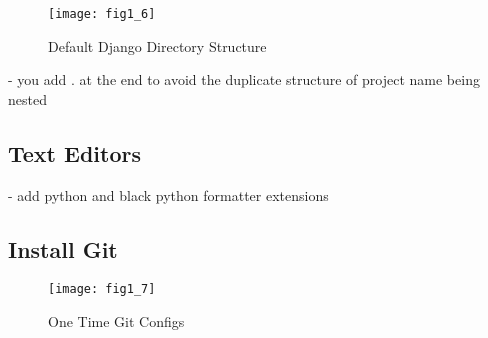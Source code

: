 \documentclass{article}
\begin{document}
\begin{figure}[H]
	\centering
	\texttt{[image: fig1\_6]}
	\caption {Default Django Directory Structure}
\end{figure}

- you add . at the end to avoid the duplicate structure of project name being nested

\subsection{Text Editors}
- add python and black python formatter extensions


\subsection{Install Git}
\begin{figure}[H]
	\centering
	\texttt{[image: fig1\_7]}
	\caption {One Time Git Configs}
\end{figure}

\fi
\end{document}
